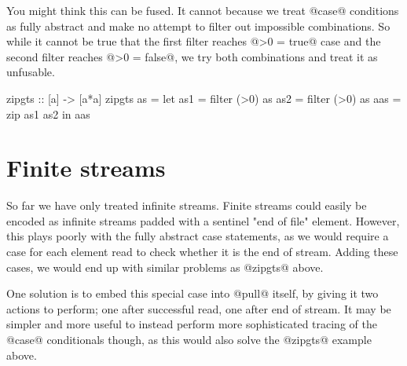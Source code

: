 You might think this can be fused.
It cannot because we treat @case@ conditions as fully abstract and make no attempt to filter out impossible combinations.
So while it cannot be true that the first filter reaches @>0 = true@ case and the second filter reaches @>0 = false@, we try both combinations and treat it as unfusable.
\begin{code}
zipgts :: [a] -> [a*a]
zipgts as =
  let as1 = filter (>0) as
      as2 = filter (>0) as
      aas = zip as1 as2
  in  aas
\end{code}

\section{Finite streams}
So far we have only treated infinite streams.
Finite streams could easily be encoded as infinite streams padded with a sentinel "end of file" element.
However, this plays poorly with the fully abstract case statements, as we would require a case for each element read to check whether it is the end of stream.
Adding these cases, we would end up with similar problems as @zipgts@ above.

One solution is to embed this special case into @pull@ itself, by giving it two actions to perform; one after successful read, one after end of stream.
It may be simpler and more useful to instead perform more sophisticated tracing of the @case@ conditionals though, as this would also solve the @zipgts@ example above.



